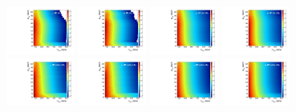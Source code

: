 \begin{figure}[htbp]
  \centering
  \includegraphics[width=0.2\textwidth]{fig/analysisAppendix/template_nonRes_mu_HP_bb_LDy.pdf}
  \includegraphics[width=0.2\textwidth]{fig/analysisAppendix/template_nonRes_e_HP_bb_LDy.pdf}
  \includegraphics[width=0.2\textwidth]{fig/analysisAppendix/template_nonRes_mu_LP_bb_LDy.pdf}
  \includegraphics[width=0.2\textwidth]{fig/analysisAppendix/template_nonRes_e_LP_bb_LDy.pdf}\\
  \includegraphics[width=0.2\textwidth]{fig/analysisAppendix/template_nonRes_mu_HP_nobb_LDy.pdf}
  \includegraphics[width=0.2\textwidth]{fig/analysisAppendix/template_nonRes_e_HP_nobb_LDy.pdf}
  \includegraphics[width=0.2\textwidth]{fig/analysisAppendix/template_nonRes_mu_LP_nobb_LDy.pdf}
  \includegraphics[width=0.2\textwidth]{fig/analysisAppendix/template_nonRes_e_LP_nobb_LDy.pdf}\\

\end{figure}
